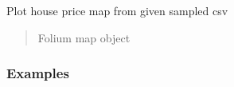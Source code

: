 \documentclass[letterpaper,10pt,english]{sphinxmanual}
\begin{document}
\begin{fulllineitems}
\label{\detokenize{index:flood_tool.plot_house_price_sampled}}
\pysigstartsignatures
{}
\pysigstopsignatures
\sphinxAtStartPar
Plot house price map from given sampled csv
\begin{quote}\begin{description}
\sphinxAtStartPar
Folium map object

\end{description}\end{quote}
\subsubsection*{Examples}

\begin{sphinxVerbatim}[commandchars=\\\{\}]
  
\end{sphinxVerbatim}

\end{fulllineitems}

\end{document}
